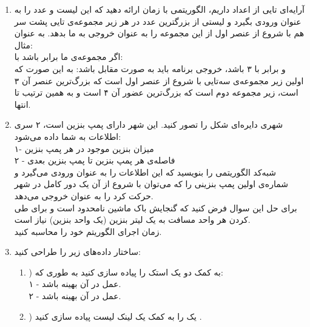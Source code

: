 \documentclass{article}
\begin{document}
\begin{enumerate}
\begin{enumerate}
	\end{enumerate}
	\item آرایه‌ای تایی از اعداد داریم، الگوریتمی با زمان  ارائه دهید که این لیست  و عدد  را به عنوان ورودی بگیرد و  لیستی از  بزرگترین عدد در هر زیر مجموعه‌ی  تایی پشت سر هم با شروع از عنصر اول از این مجموعه را به عنوان خروجی به ما بدهد. به عنوان مثال:\\
	اگر مجموعه‌ی ما برابر باشد با:	\lr{[1, 3, 2, 4, -1, 7, 6, 9]}\\
	و  برابر با ۳ باشد، خروجی برنامه باید به صورت مقابل باشد: 
	به این صورت که اولین زیر مجموعه‌ی سه‌تایی با شروع از عنصر اول \lr{[1, 3, 2]} است که بزرگ‌ترین عنصر آن ۳ است، زیر مجموعه دوم \lr{[3, 2, 4]} است که بزرگ‌ترین عضور آن ۴ است و به همین ترتیب تا انتها.
	\item شهری دایره‌ای شکل را تصور کنید. این شهر دارای  پمپ بنزین است، ۲ سری اطلاعات به شما داده می‌شود:\\
	۱- میزان بنزین موجود در هر پمپ بنزین \\
	۲ - فاصله‌ی هر پمپ بنزین تا پمپ بنزین بعدی \\
	شبه‌کد الگوریتمی را بنویسید که این اطلاعات را به عنوان ورودی می‌گیرد و شماره‌ی اولین پمپ بنزینی را که می‌توان با شروع از آن یک دور کامل در شهر حرکت کرد را به عنوان خروجی می‌دهد. 
	\\برای حل این سوال فرض کنید که گنجایش باک ماشین نامحدود است و برای طی کردن هر واحد مسافت به یک لیتر بنزین (یک واحد بنزین) نیاز است.\\
	زمان اجرای الگوریتم خود را محاسبه کنید.

	\item ساختار داده‌های زیر را طراحی کنید:
	\begin{enumerate}
		\item) به کمک دو  یک استک را پیاده سازی کنید به طوری که:\\
		۱ - عمل  در آن بهینه باشد.\\
		۲ - عمل  در آن بهینه باشد.
		\item) یک  را به کمک یک لینک لیست پیاده سازی کنید .
	\end{enumerate}
\end{enumerate}

\newpage
\end{document}
